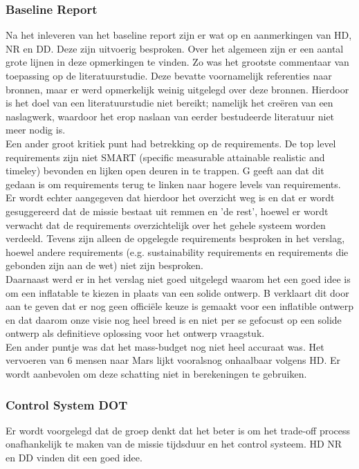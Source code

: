 \subsubsection{Baseline Report}
Na het inleveren van het baseline report zijn er wat op en aanmerkingen van HD, NR en DD. Deze zijn uitvoerig besproken. Over het algemeen zijn er een aantal grote lijnen in deze opmerkingen te vinden. Zo was het grootste commentaar van toepassing op de literatuurstudie. Deze bevatte voornamelijk referenties naar bronnen, maar er werd opmerkelijk weinig uitgelegd over deze bronnen. Hierdoor is het doel van een literatuurstudie niet bereikt; namelijk het creëren van een naslagwerk, waardoor het erop naslaan van eerder bestudeerde literatuur niet meer nodig is. \\
Een ander groot kritiek punt had betrekking op de requirements. De top level requirements zijn niet SMART (specific measurable attainable realistic and timeley) bevonden en lijken open deuren in te trappen. G geeft aan dat dit gedaan is om requirements terug te linken naar hogere levels van requirements. Er wordt echter aangegeven dat hierdoor het overzicht weg is en dat er wordt gesuggereerd dat de missie bestaat uit remmen en 'de rest', hoewel er wordt verwacht dat de requirements overzichtelijk over het gehele systeem worden verdeeld.  Tevens zijn alleen de opgelegde requirements besproken in het verslag, hoewel andere requirements (e.g. sustainability requirements en requirements die gebonden zijn aan de wet) niet zijn besproken.\\
Daarnaast werd er in het verslag niet goed uitgelegd waarom het een goed idee is om een inflatable te kiezen in plaats van een solide ontwerp. B verklaart dit door aan te geven dat er nog geen officiële keuze is gemaakt voor een inflatible ontwerp en dat daarom onze visie nog heel breed is en niet per se gefocust op een solide ontwerp als definitieve oplossing voor het ontwerp vraagstuk.\\
Een ander puntje was dat het mass-budget nog niet heel accuraat was. Het vervoeren van 6 mensen naar Mars lijkt vooralsnog onhaalbaar volgens HD. Er wordt aanbevolen om deze schatting niet in berekeningen te gebruiken.\\

\subsubsection{Control System DOT}
Er wordt voorgelegd dat de groep denkt dat het beter is om het trade-off process onafhankelijk te maken van de missie tijdsduur en het control systeem. HD NR en DD vinden dit een goed idee.

